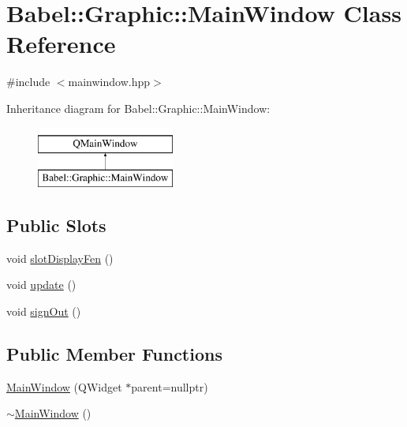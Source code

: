 \hypertarget{classBabel_1_1Graphic_1_1MainWindow}{}\section{Babel\+:\+:Graphic\+:\+:Main\+Window Class Reference}
\label{classBabel_1_1Graphic_1_1MainWindow}


{\ttfamily \#include $<$mainwindow.\+hpp$>$}

Inheritance diagram for Babel\+:\+:Graphic\+:\+:Main\+Window\+:\begin{figure}[H]
\begin{center}
\leavevmode
\includegraphics[height=2.000000cm]{classBabel_1_1Graphic_1_1MainWindow}
\end{center}
\end{figure}
\subsection*{Public Slots}
\begin{DoxyCompactItemize}
\item 
void \hyperlink{classBabel_1_1Graphic_1_1MainWindow_ae0f5be307c0f9810876ca66b616f55b1}{slot\+Display\+Fen} ()
\item 
void \hyperlink{classBabel_1_1Graphic_1_1MainWindow_a86fb4e755f46d1e6bb8f5d4b7b4d8297}{update} ()
\item 
void \hyperlink{classBabel_1_1Graphic_1_1MainWindow_af95d71528ef6d1e5493ba35081e39ac7}{sign\+Out} ()
\end{DoxyCompactItemize}
\subsection*{Public Member Functions}
\begin{DoxyCompactItemize}
\item 
\hyperlink{classBabel_1_1Graphic_1_1MainWindow_a7bb070a7c0f98f813839903a6fa54afe}{Main\+Window} (Q\+Widget $\ast$parent=nullptr)
\item 
\hyperlink{classBabel_1_1Graphic_1_1MainWindow_a6e5a2a95b7c10ff558c73c82fa193ab6}{$\sim$\+Main\+Window} ()
\end{DoxyCompactItemize}


